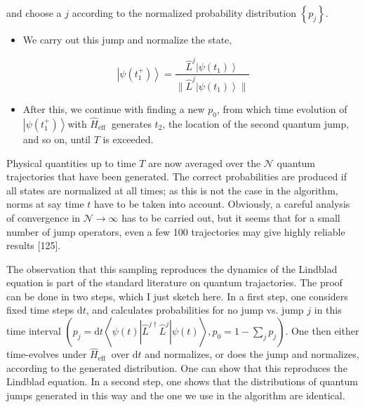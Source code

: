 \documentclass[12pt]{article}
\begin{document}
and choose a $j$ according to the normalized probability distribution $\left\{p_{j}\right\}$.

\begin{itemize}
  \item We carry out this jump and normalize the state,
\end{itemize}


\begin{equation*}
\left|\psi\left(t_{1}^{+}\right)\right\rangle=\frac{\hat{L}^{j}\left|\psi\left(t_{1}\right)\right\rangle}{\| \hat{L}^{j}\left|\psi\left(t_{1}\right)\right\rangle \|} \tag{318}
\end{equation*}


\begin{itemize}
  \item After this, we continue with finding a new $p_{0}$, from which time evolution of $\left|\psi\left(t_{1}^{+}\right)\right\rangle$with $\hat{H}_{\text {eff }}$ generates $t_{2}$, the location of the second quantum jump, and so on, until $T$ is exceeded.
\end{itemize}

Physical quantities up to time $T$ are now averaged over the $\mathcal{N}$ quantum trajectories that have been generated. The correct probabilities are produced if all states are normalized at all times; as this is not the case in the algorithm, norms at say time $t$ have to be taken into account. Obviously, a careful analysis of convergence in $\mathcal{N} \rightarrow \infty$ has to be carried out, but it seems that for a small number of jump operators, even a few 100 trajectories may give highly reliable results [125].

The observation that this sampling reproduces the dynamics of the Lindblad equation is part of the standard literature on quantum trajactories. The proof can be done in two steps, which I just sketch here. In a first step, one considers fixed time steps $\mathrm{d} t$, and calculates probabilities for no jump vs. jump $j$ in this time interval $\left(p_{j}=\mathrm{d} t\left\langle\psi(t)\left|\hat{L}^{j \dagger} \hat{L}^{j}\right| \psi(t)\right\rangle, p_{0}=1-\sum_{j} p_{j}\right)$. One then either time-evolves under $\hat{H}_{\text {eff }}$ over $\mathrm{d} t$ and normalizes, or does the jump and normalizes, according to the generated distribution. One can show that this reproduces the Lindblad equation. In a second step, one shows that the distributions of quantum jumps generated in this way and the one we use in the algorithm are identical.
\end{document}
